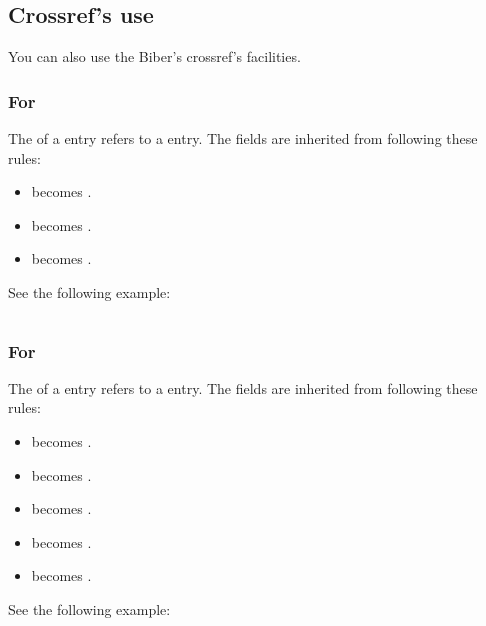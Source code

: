 \documentclass{ltxdockit}[2011/03/25]
\begin{document}
\subsection{Crossref's use}

You can also use the Biber's crossref's facilities.

\subsubsection{For }
The  of a  entry refers to a  entry. The fields are inherited from  following these rules:

\begin{itemize}
	\item {} becomes .
	\item {} becomes .
	\item {} becomes .

\end{itemize}

See the following example:

\inputminted[breaklines]{latex}{example-bookinarticle.bib}

\subsubsection{For }

The  of a  entry refers to a  entry. The fields are inherited from  following these rules:

\begin{itemize}
	\item {} becomes .
	\item {} becomes .
	\item {} becomes .
	\item {} becomes .
	\item {} becomes .

\end{itemize}

See the following example:
\end{document}
